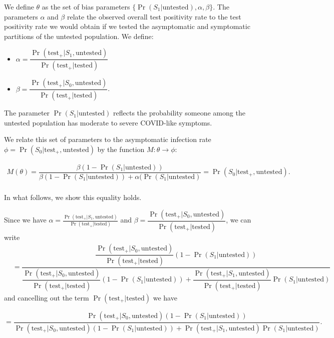 \documentclass[12pt,twoside]{smiththesis}
\providecommand{\tightlist}{%
  \setlength{\itemsep}{0pt}\setlength{\parskip}{0pt}}
\begin{document}
\indent We define \(\theta\) as the set of bias parameters \(\{\Pr(S_1|\text{untested}), \alpha, \beta \}\). The parameters \(\alpha\) and \(\beta\) relate the observed overall test positivity rate to the test positivity rate we would obtain if we tested the asymptomatic and symptomatic partitions of the untested population. We define:
\begin{itemize}
\tightlist
\item
  \(\alpha = \dfrac{\Pr(\text{test}_+|S_1,\text{untested})}{\Pr(\text{test}_+|\text{tested})}\)
\item
  \(\beta = \dfrac{\Pr(\text{test}_+|S_0,\text{untested})}{\Pr(\text{test}_+|\text{tested})}\).
\end{itemize}
The parameter \(\Pr(S_1|\text{untested})\) reflects the probability someone among the untested population has moderate to severe COVID-like symptoms.

We relate this set of parameters to the asymptomatic infection rate \(\phi = \Pr(S_0|\text{test}_+, \text{untested})\) by the function \(M: \theta \to \phi\):
\begin{tcolorbox}
\vspace{2 mm}
\begin{align*}   
 M(\theta)  = \dfrac{\beta (1- \Pr(S_1|\text{untested}))}{\beta(1- \Pr(S_1|\text{untested})) + \alpha(\Pr(S_1|\text{untested})} = \Pr(S_0|\text{test}_+, \text{untested}).\\
\end{align*}
\end{tcolorbox}
\noindent In what follows, we show this equality holds.

\noindent Since we have \(\alpha = \frac{\Pr(\text{test}_+|S_1, \text{untested})}{\Pr(\text{test}_+|\text{tested})}\) and \(\beta = \dfrac{\Pr(\text{test}_+|S_0, \text{untested})}{\Pr(\text{test}_+|\text{tested})}\), we can write
\begin{align*}  &= \dfrac{\dfrac{\Pr(\text{test}_+|S_0, \text{untested})}{\Pr(\text{test}_+|\text{tested})}(1 - \Pr(S_1|\text{untested}))}{\dfrac{\Pr(\text{test}_+|S_0, \text{untested})}{\Pr(\text{test}_+|\text{tested})}(1-\Pr(S_1|\text{untested})) + \dfrac{\Pr(\text{test}_+|S_1, \text{untested})}{\Pr(\text{test}_+|\text{tested})} \Pr(S_1|\text{untested})}
\end{align*}
and cancelling out the term \(\Pr(\text{test}_+|\text{tested})\) we have

\[ = \dfrac{{\Pr(\text{test}_+|S_0, \text{untested})}(1 - \Pr(S_1|\text{untested}))}{\Pr(\text{test}_+|S_0, \text{untested})(1-\Pr(S_1|\text{untested})) + \Pr(\text{test}_+|S_1, \text{untested}) \Pr(S_1|\text{untested})}.\]
\end{document}

